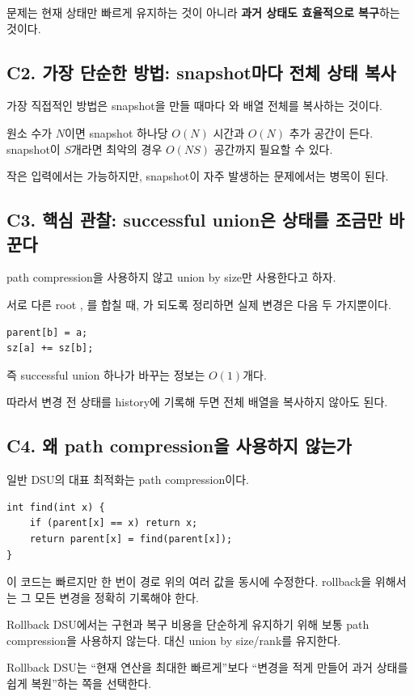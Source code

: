 문제는 현재 상태만 빠르게 유지하는 것이 아니라 \textbf{과거 상태도 효율적으로 복구}하는 것이다.

\subsection{C2. 가장 단순한 방법: snapshot마다 전체 상태 복사}
가장 직접적인 방법은 snapshot을 만들 때마다 와  배열 전체를 복사하는 것이다.

원소 수가 $N$이면 snapshot 하나당 $O(N)$ 시간과 $O(N)$ 추가 공간이 든다. snapshot이 $S$개라면 최악의 경우 $O(NS)$ 공간까지 필요할 수 있다.

작은 입력에서는 가능하지만, snapshot이 자주 발생하는 문제에서는 병목이 된다.

\subsection{C3. 핵심 관찰: successful union은 상태를 조금만 바꾼다}
path compression을 사용하지 않고 union by size만 사용한다고 하자.

서로 다른 root , 를 합칠 때, 가 되도록 정리하면 실제 변경은 다음 두 가지뿐이다.
\begin{lstlisting}
parent[b] = a;
sz[a] += sz[b];
\end{lstlisting}

즉 successful union 하나가 바꾸는 정보는 $O(1)$개다.

따라서 변경 전 상태를 history에 기록해 두면 전체 배열을 복사하지 않아도 된다.

\subsection{C4. 왜 path compression을 사용하지 않는가}
일반 DSU의 대표 최적화는 path compression이다.
\begin{lstlisting}
int find(int x) {
    if (parent[x] == x) return x;
    return parent[x] = find(parent[x]);
}
\end{lstlisting}

이 코드는 빠르지만  한 번이 경로 위의 여러  값을 동시에 수정한다. rollback을 위해서는 그 모든 변경을 정확히 기록해야 한다.

Rollback DSU에서는 구현과 복구 비용을 단순하게 유지하기 위해 보통 path compression을 사용하지 않는다. 대신 union by size/rank를 유지한다.

\begin{keybox}
Rollback DSU는 ``현재 연산을 최대한 빠르게''보다 ``변경을 적게 만들어 과거 상태를 쉽게 복원''하는 쪽을 선택한다.
\end{keybox}

